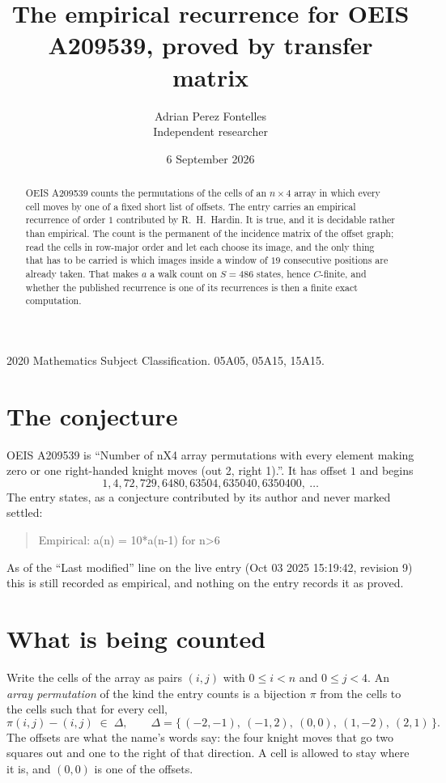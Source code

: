 \documentclass[11pt,a4paper]{article}
\title{The empirical recurrence for OEIS A209539, proved by transfer matrix}
\author{Adrian Perez Fontelles\\ \small Independent researcher}
\date{6 September 2026}
\theoremstyle{plain}
\theoremstyle{definition}
\begin{document}
\maketitle

\begin{abstract}
OEIS A209539 counts the permutations of the cells of an $n\times4$ array in which every cell
moves by one of a fixed short list of offsets. The entry carries an empirical recurrence of
order $1$ contributed by R.~H.~Hardin. It is true, and it is decidable rather than
empirical. The count is the permanent of the incidence matrix of the offset graph; read the
cells in row-major order and let each choose its image, and the only thing that has to be
carried is which images inside a window of $19$ consecutive positions are already taken.
That makes $a$ a walk count on $S=486$ states, hence $C$-finite, and whether the published
recurrence is one of its recurrences is then a finite exact computation.
\end{abstract}

\noindent\small 2020 Mathematics Subject Classification. 05A05, 05A15, 15A15.\normalsize

\section{The conjecture}

OEIS A209539 is ``Number of nX4 array permutations with every element making zero or one right-handed knight moves (out 2, right 1).''. It has offset $1$ and begins
\[
1, 4, 72, 729, 6480, 63504, 635040, 6350400,\ \dots
\]
The entry states, as a conjecture contributed by its author and never marked settled:
\begin{quote}
Empirical: a(n) = 10*a(n-1) for n>6
\end{quote}
As of the ``Last modified'' line on the live entry (Oct 03 2025 15:19:42, revision 9) this is still
recorded as empirical, and nothing on the entry records it as proved.

\section{What is being counted}

Write the cells of the array as pairs $(i,j)$ with $0\le i<n$ and $0\le j<4$. An
\emph{array permutation} of the kind the entry counts is a bijection $\pi$ from the cells to
the cells such that for every cell,
\[
\pi(i,j)-(i,j)\;\in\;\Delta,\qquad
\Delta=\{\,(-2,-1),\ (-1,2),\ (0,0),\ (1,-2),\ (2,1)\,\}.
\]
The offsets are what the name's words say: the four knight moves that go two squares out and one to the right of that direction. A cell is allowed to stay where it is, and $(0,0)$ is one of the offsets.
\end{document}
